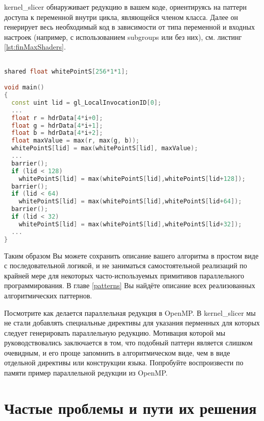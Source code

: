 \documentclass[11pt,fleqn,english,russian]{report} %
\begin{document}
kernel\_slicer обнаруживает редукцию в вашем коде, ориентируясь на паттерн доступа к переменной внутри цикла, являющейся членом класса. Далее он генерирует весь необходимый код в зависимости от типа переменной и входных настроек (например, с использованием subgroups или без них), см. листинг \ref{lst:finMaxShaders}.

\begin{lstlisting}[language=C++, 
	               caption=Фрагмент сгенерированного GLSL шейдера для параллельной редукции, 
	               label=lst:finMaxShaders]	

shared float whitePointS[256*1*1]; 

void main()
{	               
  const uint lid = gl_LocalInvocationID[0];
  ...	               
  float r = hdrData[4*i+0];
  float g = hdrData[4*i+1];
  float b = hdrData[4*i+2];
  float maxValue = max(r, max(g, b));
  whitePointS[lid] = max(whitePointS[lid], maxValue);
  ...
  barrier();
  if (lid < 128) 
  	whitePointS[lid] = max(whitePointS[lid],whitePointS[lid+128]);
  barrier();
  if (lid < 64) 
  	whitePointS[lid] = max(whitePointS[lid],whitePointS[lid+64]);
  barrier();
  if (lid < 32) 
  	whitePointS[lid] = max(whitePointS[lid],whitePointS[lid+32]);
  ...
}  
\end{lstlisting}

Таким образом Вы можете сохранить описание вашего алгоритма в простом виде с последовательной логикой, и не заниматься самостоятельной реализаций по крайней мере для некоторых часто-используемых примитивов параллельного программирования. В главе \ref{patterns} Вы найдёте описание всех реализованных алгоритмических паттернов.

\begin{remark}
Посмотрите как делается параллельная редукция в OpenMP. В kernel\_slicer мы не стали добавлять специальные директивы для указания перменных для которых следует генерировать параллельную редукцию. Мотивация которой мы руководствовались заключается в том, что подобный паттерн является слишком очевидным, и его проще запомнить в алгоритмическом виде, чем в виде отдельной директивы или конструкции языка. Попробуйте воспроизвести по памяти пример параллельной редукции из OpenMP.
\end{remark}

\chapter{Частые проблемы и пути их решения}
\end{document}
